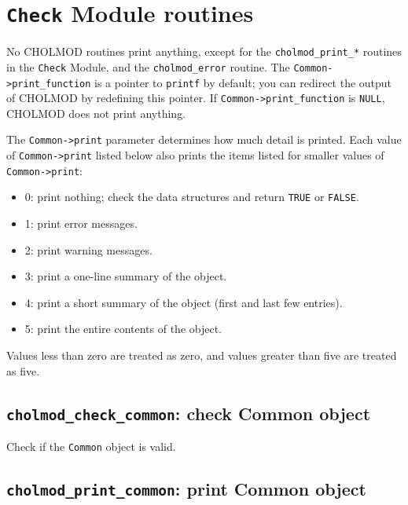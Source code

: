 \documentclass[11pt]{article}
\begin{document}
\newpage \section{{\tt Check} Module routines}

No CHOLMOD routines print anything, except for the {\tt cholmod\_print\_*}
routines in the {\tt Check} Module, and the {\tt cholmod\_error} routine.  The
{\tt Common->print\_function} is a pointer to {\tt printf} by default;
you can redirect the output of CHOLMOD by redefining this pointer.
If {\tt Common->print\_function} is {\tt NULL}, CHOLMOD does not print anything.

The {\tt Common->print} parameter determines how much detail is printed.
Each value of {\tt Common->print} listed below also prints the items listed
for smaller values of {\tt Common->print}:
\begin{itemize}
\item 0: print nothing; check the data structures and return {\tt TRUE} or {\tt FALSE}.
\item 1: print error messages.
\item 2: print warning messages.
\item 3: print a one-line summary of the object.
\item 4: print a short summary of the object (first and last few entries).
\item 5: print the entire contents of the object.
\end{itemize}
Values less than zero are treated as zero, and values greater than five are
treated as five.

\subsection{{\tt cholmod\_check\_common}: check Common object}


Check if the {\tt Common} object is valid.

\subsection{{\tt cholmod\_print\_common}: print Common object}
\end{document}
